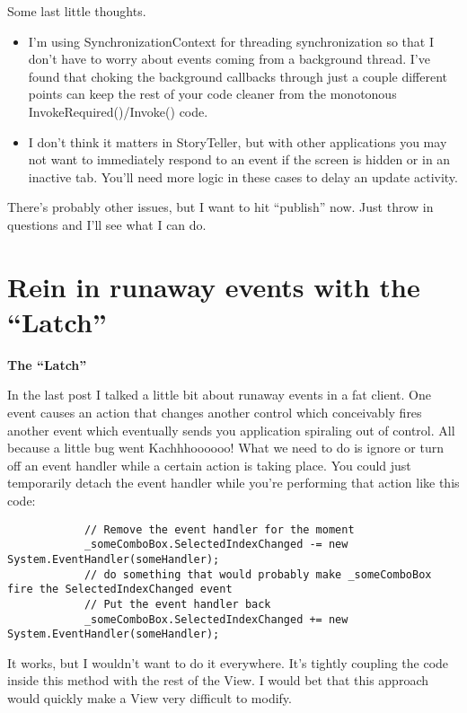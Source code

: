 \documentclass{article}
\begin{document}
{Some last little thoughts. 
 \begin{itemize}
     \item  I'm using SynchronizationContext for threading synchronization so that I don't have to worry about events coming from a background thread.  I've found that choking the background callbacks through just a couple different points can keep the rest of your code cleaner from the monotonous InvokeRequired()/Invoke() code.   
 \item  I don't think it matters in StoryTeller, but with other applications you may not want to immediately respond to an event if the screen is hidden or in an inactive tab.  You'll need more logic in these cases to delay an update activity.  
 \end{itemize}
 
 There's probably other issues, but I want to hit “publish” now.  Just throw in questions and I'll see what I can do.

\section{ Rein in runaway events with the “Latch” } 

\Large {\textbf{The “Latch” }}

In the last post I talked a little bit about runaway events in a fat client.  One event causes an action that changes another control which conceivably fires another event which eventually sends you application spiraling out of control.  All because a little bug went Kachhhoooooo!  What we need to do is ignore or turn off an event handler while a certain action is taking place.  You could just temporarily detach the event handler while you're performing that action like this code:

 \begin{lstlisting}
            // Remove the event handler for the moment
            _someComboBox.SelectedIndexChanged -= new System.EventHandler(someHandler);
            // do something that would probably make _someComboBox fire the SelectedIndexChanged event
            // Put the event handler back
            _someComboBox.SelectedIndexChanged += new System.EventHandler(someHandler);
 \end{lstlisting}

It works, but I wouldn't want to do it everywhere.  It's tightly coupling the code inside this method with the rest of the View.  I would bet that this approach would quickly make a View very difficult to modify. 

}
\end{document}
